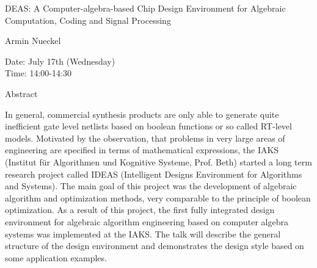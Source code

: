 \begin{center}
\LARGE
DEAS: A Computer-algebra-based Chip Design
 Environment for Algebraic Computation, Coding and Signal
                           Processing 
\end{center}

\begin{center}
\Large
Armin Nueckel
\end{center}

\noindent
Date:  July 17th (Wednesday)\\
Time: 14:00-14:30\\

\begin{center}
\large
Abstract
\end{center}

In general, commercial synthesis products are only able to generate quite inefficient gate level
netlists based on boolean functions or so called RT-level models. Motivated by the observation,
that problems in very large areas of engineering are specified in terms of mathematical
expressions, the IAKS (Institut f\"ur Algorithmen und Kognitive Systeme, Prof. Beth) started a long
term research project called IDEAS (Intelligent Designs Environment for Algorithms and
Systems). The main goal of this project was the development of algebraic algorithm and
optimization methods, very comparable to the principle of boolean optimization. As a result of
this project, the first fully integrated design environment for algebraic algorithm engineering
based on computer algebra systems was implemented at the IAKS. The talk will describe the
general structure of the design environment and demonstrates the design style based on some
application examples. 

